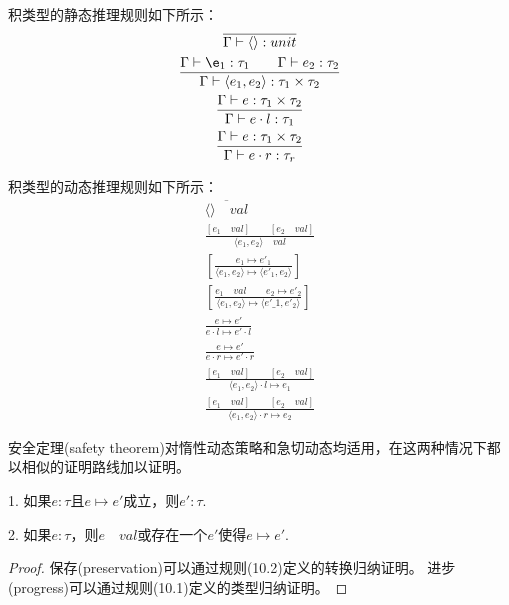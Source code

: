 
积类型的静态推理规则如下所示：
\begin{subequations}
    \begin{gather}
    \overline{\Gamma \vdash \langle \rangle : unit} \\
    \frac{\Gamma \vdash \e_1: \tau_1 \qquad \Gamma \vdash e_2 : \tau_2}
    {\Gamma \vdash \langle e_1,e_2 \rangle : \tau_1 \times \tau_2} \\
    \frac{\Gamma \vdash e : \tau_1 \times \tau_2}
    {\Gamma \vdash e \cdot l : \tau_1} \\
    \frac{\Gamma \vdash e : \tau_1 \times \tau_2}
    {\Gamma \vdash e \cdot r : \tau_r} 
    \end{gather}
\end{subequations}

积类型的动态推理规则如下所示：
\begin{subequations}
    \begin{gather}
    \overline{\langle \rangle \quad val} \\
    \frac{[e_1 \quad val] \qquad [e_2 \quad val]}
    {\langle e_1, e_2 \rangle \quad val} \\
    \left[\frac{e_1 \mapsto e'_{1} }
    {\langle e_1, e_2 \rangle \mapsto \langle e'_{1}, e_2 \rangle}
    \right] \\
    \left[\frac{e_1 \quad val \qquad e_2 \mapsto e'_{2} }
    {\langle e_1, e_2 \rangle \mapsto \langle e'\_{1}, e'_2 \rangle}
    \right] \\
    \frac{e \mapsto e'}{e \cdot l \mapsto e' \cdot l} \\
    \frac{e \mapsto e'}{e \cdot r \mapsto e' \cdot r} \\
    \frac{[e_1 \quad val] \qquad [e_2 \quad val]}
    {\langle e_1, e_2 \rangle \cdot l \mapsto e_1} \\
    \frac{[e_1 \quad val] \qquad [e_2 \quad val]}
    {\langle e_1, e_2 \rangle \cdot r \mapsto e_2} 
    \end{gather}
\end{subequations}


安全定理(safety theorem)对惰性动态策略和急切动态均适用，在这两种情况下都以相似的证明路线加以证明。

\begin{theorem}[安全定理]\label{theorem:safety}
1. 如果$e:\tau$且$e\mapsto e'$成立，则$e':\tau$.

2. 如果$e:\tau$，则$e\quad val$或存在一个$e'$使得$e\mapsto e'$.
\end{theorem}
\begin{proof}
保存(preservation)可以通过规则(10.2)定义的转换归纳证明。
进步(progress)可以通过规则(10.1)定义的类型归纳证明。
\end{proof}


